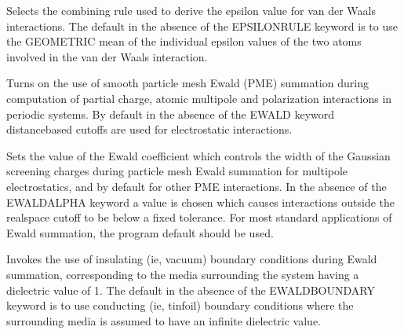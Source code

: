 \documentclass[letterpaper,11pt,english]{sphinxmanual}
\begin{document}
\ignorespaces {}\label{\detokenize{text/keywords:key-epsilonrule}}\begin{description}
\sphinxAtStartPar
Selects the combining rule used to derive the epsilon value for van der Waals interactions. The default in the absence of the EPSILONRULE keyword is to use the GEOMETRIC mean of the individual epsilon values of the two atoms involved in the van der Waals interaction.

\end{description}

\ignorespaces {}\label{\detokenize{text/keywords:key-ewald}}\begin{description}
\sphinxAtStartPar
Turns on the use of smooth particle mesh Ewald (PME) summation during computation of partial charge, atomic multipole and polarization interactions in periodic systems. By default in the absence of the EWALD keyword distance\sphinxhyphen{}based cutoffs are used for electrostatic interactions.

\end{description}

\ignorespaces {}\label{\detokenize{text/keywords:key-ewald-alpha}}\begin{description}
\sphinxAtStartPar
Sets the value of the Ewald coefficient which controls the width of the Gaussian screening charges during particle mesh Ewald summation for multipole electrostatics, and by default for other PME interactions. In the absence of the EWALD\sphinxhyphen{}ALPHA keyword a value is chosen which causes interactions outside the real\sphinxhyphen{}space cutoff to be below a fixed tolerance. For most standard applications of Ewald summation, the program default should be used.

\end{description}

\ignorespaces {}\label{\detokenize{text/keywords:key-ewald-boundary}}\begin{description}
\sphinxAtStartPar
Invokes the use of insulating (ie, vacuum) boundary conditions during Ewald summation, corresponding to the media surrounding the system having a dielectric value of 1. The default in the absence of the EWALD\sphinxhyphen{}BOUNDARY keyword is to use conducting (ie, tinfoil) boundary conditions where the surrounding media is assumed to have an infinite dielectric value.

\end{description}
\end{document}
